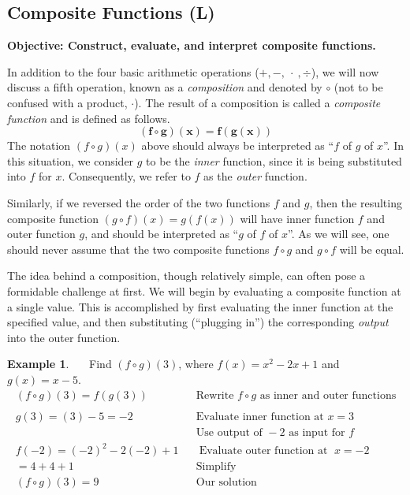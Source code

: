 \documentclass[12pt]{book}
\theoremstyle{definition}
\newtheorem{example}{Example}
\newcommand{\tmmathbf}[1]{\ensuremath{\boldsymbol{#1}}}
\newcommand{\tmop}[1]{\ensuremath{\operatorname{#1}}}
\begin{document}
\subsection{Composite Functions (L)}
{\bf Objective: Construct, evaluate, and interpret composite functions.}\par
In addition to the four basic arithmetic operations ($+,-,~\cdot~,\div$), we will now discuss a fifth operation, known as a {\it composition} and denoted by $\circ$ (not to be confused with a product, $\cdot$). The result of a composition is called a {\it composite function} and is defined as follows.
\[ \tmmathbf{(f \circ g) (x) = f (g (x))} \]
The notation $(f\circ g)(x)$ above should always be interpreted as ``$f$ of $g$ of $x$''.  In this situation, we consider $g$ to be the {\it inner} function, since it is being substituted into $f$ for $x$.  Consequently, we refer to $f$ as the {\it outer} function.\par
Similarly, if we reversed the order of the two functions $f$ and $g$, then the resulting composite function $(g\circ f)(x)=g(f(x))$ will have inner function $f$ and outer function $g$, and should be interpreted as ``$g$ of $f$ of $x$''.  As we will see, one should never assume that the two composite functions $f\circ g$ and $g\circ f$ will be equal.\par
The idea behind a composition, though relatively simple, can often pose a formidable challenge at first.  We will begin by evaluating a composite function at a single value.  This is accomplished by first evaluating the inner function at the specified value, and
then substituting (``plugging in'') the corresponding {\it output} into the outer function.
\begin{example}~~~Find $(f\circ g)(3)$, where $f(x)=x^2-2x+1$ and $g(x)=x-5$.
  \begin{eqnarray*}
   (f \circ g) (3)=f (g (3)) &  & \text{Rewrite~} f\circ g \text{~as~inner~and~outer~functions}\\
	    &  & \\
 	g (3) = (3) - 5 = - 2~~~~~~~ &  & \text{Evaluate~inner~function~at~} x=3\\
		& & \text{Use~output~of~} -2 \text{~as~input~for~} f\\
    f (- 2) = (- 2)^2 - 2 (- 2) + 1 &  & \tmop{Evaluate~outer~function~at~} x=-2\\
    = 4 + 4 + 1~~~~~~~~~~~~ &  & \tmop{Simplify}\\
		(f \circ g) (3) = 9 &  & \text{Our solution}
  \end{eqnarray*}
\end{example}
\end{document}
